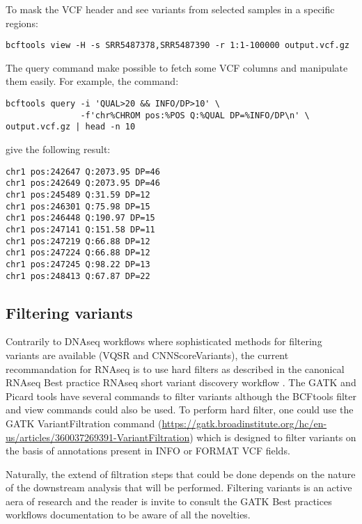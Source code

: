 To mask the VCF header and see variants from selected samples in a specific regions:
\begin{verbatim}
bcftools view -H -s SRR5487378,SRR5487390 -r 1:1-100000 output.vcf.gz
\end{verbatim}


The query command make possible to fetch some VCF columns and manipulate them easily. For example, the command:

\begin{verbatim}
bcftools query -i 'QUAL>20 && INFO/DP>10' \
	           -f'chr%CHROM pos:%POS Q:%QUAL DP=%INFO/DP\n' \
output.vcf.gz | head -n 10
\end{verbatim}

give the following result:
\begin{verbatim}
chr1 pos:242647 Q:2073.95 DP=46
chr1 pos:242649 Q:2073.95 DP=46
chr1 pos:245489 Q:31.59 DP=12
chr1 pos:246301 Q:75.98 DP=15
chr1 pos:246448 Q:190.97 DP=15
chr1 pos:247141 Q:151.58 DP=11
chr1 pos:247219 Q:66.88 DP=12
chr1 pos:247224 Q:66.88 DP=12
chr1 pos:247245 Q:98.22 DP=13
chr1 pos:248413 Q:67.87 DP=22
\end{verbatim}






\subsection{Filtering variants}





Contrarily to DNAseq workflows where sophisticated methods for filtering variants are available (VQSR and CNNScoreVariants), the current recommandation for RNAseq is to use hard filters as described in the canonical RNAseq Best practice RNAseq short variant discovery workflow \cite{GATK_RNAseq_variant_discovery}. The GATK and Picard tools have several commands to filter variants although the BCFtools filter and view commands could also be used. To perform hard filter, one could use the GATK VariantFiltration command  (\href{https://gatk.broadinstitute.org/hc/en-us/articles/360037269391-VariantFiltration}{https://gatk.broadinstitute.org/hc/en-us/articles/360037269391-VariantFiltration}) which is designed to filter variants on the basis of annotations present in INFO or FORMAT VCF fields.

Naturally, the extend of filtration steps that could be done depends on the nature of the downstream analysis that will be performed. Filtering variants is an active aera of research and the reader is invite to consult the GATK Best practices workflows documentation to be aware of all the novelties.

